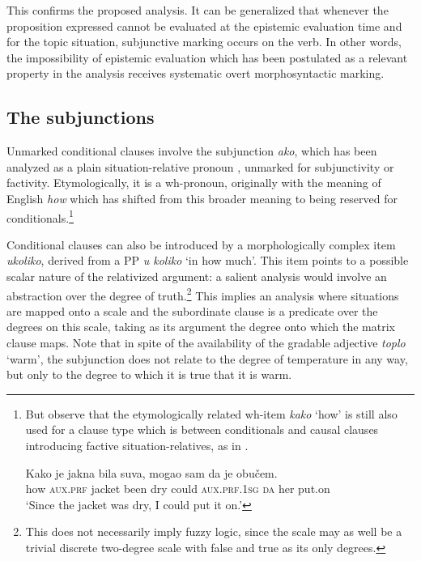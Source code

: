 \documentclass[output=paper]{langscibook}
\begin{document}
\noindent This confirms the proposed analysis. It can be generalized that whenever the proposition expressed cannot be evaluated at the epistemic evaluation time and for the topic situation, subjunctive marking occurs on the verb. In other words, the impossibility of epistemic evaluation which has been postulated as a relevant property in the analysis receives systematic overt morphosyntactic marking.


\subsection{The subjunctions}\label{subsec:Subjunctions}

Unmarked conditional clauses involve the subjunction \textit{ako}, which has been ana\-lyzed as a plain situation-relative pronoun \citep{Arsenijevic2009b}, unmarked for subjunctivity or factivity. Etymologically, it is a wh-pronoun, originally with the meaning of English \textit{how} which has shifted from this broader meaning to being reserved for conditionals.\footnote{But observe that the etymologically related wh-item \textit{kako} `how' is still also used for a clause type which is between conditionals and causal clauses introducing factive situation-relatives, as in .

\ea\label{ex:Kako}
	\gll Kako  je  jakna  bila  suva,  mogao sam  da  je  obučem.\\
how  \textsc{aux.prf}  jacket been  dry  could  \textsc{aux.prf.1sg} \textsc{da}  her  put.on\\
\glt `Since the jacket was dry, I could put it on.'
\z}

Conditional clauses can also be introduced by a morphologically complex item \textit{ukoliko}, derived from a PP \textit{u koliko} `in how much'. This item points to a possible scalar nature of the relativized argument: a salient analysis would involve an abstraction over the degree of truth.\footnote{This does not necessarily imply fuzzy logic, since the scale may as well be a trivial discrete two-degree scale with false and true as its only degrees.} This implies an analysis where situations are mapped onto a scale and the subordinate clause is a predicate over the degrees on this scale, taking as its argument the degree onto which the matrix clause maps. Note that in spite of the availability of the gradable adjective \textit{toplo} `warm', the subjunction does not relate to the degree of temperature in any way, but only to the degree to which it is true that it is warm.
\end{document}
